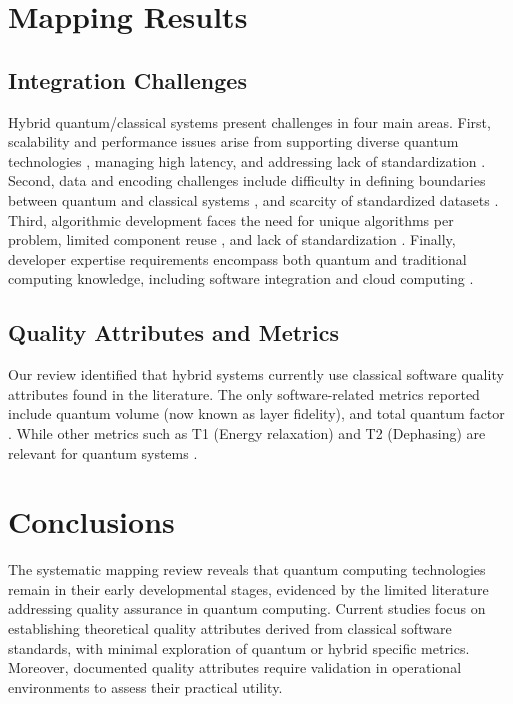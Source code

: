\section{Mapping Results}

\subsection{Integration Challenges}

Hybrid quantum/classical systems present challenges in four main areas. First, scalability and performance issues arise from supporting diverse quantum technologies \cite{Elsharkawy2023}, managing high latency, and addressing lack of standardization \cite{Cerezo2022}. Second, data and encoding challenges include difficulty in defining boundaries between quantum and classical systems \cite{Vietz2021}, and scarcity of standardized datasets \cite{Cerezo2022}. Third, algorithmic development faces the need for unique algorithms per problem, limited component reuse \cite{Moguel2022}, and lack of standardization \cite{40}. Finally, developer expertise requirements encompass both quantum and traditional computing knowledge, including software integration and cloud computing \cite{Vietz2021, Sodhi2021}.

\subsection{Quality Attributes and Metrics}

Our review identified that hybrid systems currently use classical software quality attributes \cite{Silva2023} found in the literature. The only software-related metrics reported include quantum volume (now known as layer fidelity), and total quantum factor \cite{Verduro2021}. While other metrics such as T1 (Energy relaxation) and T2 (Dephasing) are relevant for quantum systems \cite{youssefMeasuringSimulatingT12020}.%

\section{Conclusions}

The systematic mapping review reveals that quantum computing technologies remain in their early developmental stages, evidenced by the limited literature addressing quality assurance in quantum computing. Current studies focus on establishing theoretical quality attributes derived from classical software standards, with minimal exploration of quantum or hybrid specific metrics. Moreover, documented quality attributes require validation in operational environments to assess their practical utility.

